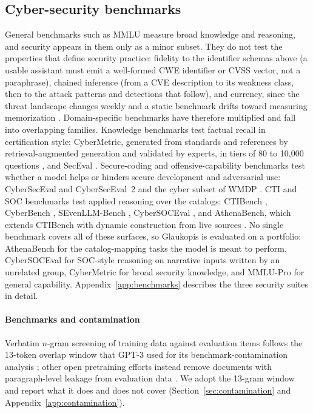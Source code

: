 \documentclass[twocolumn]{svjour3}
\begin{document}
\subsection{Cyber-security benchmarks}\label{sec:bg-benchmarks}
General benchmarks such as MMLU measure broad knowledge and reasoning, and security appears in them only as a minor subset. They do not test the properties that define security practice: fidelity to the identifier schemas above (a usable assistant must emit a well-formed CWE identifier or CVSS vector, not a paraphrase), chained inference (from a CVE description to its weakness class, then to the attack patterns and detections that follow), and currency, since the threat landscape changes weekly and a static benchmark drifts toward measuring memorization \cite{alam2025athenabench}. Domain-specific benchmarks have therefore multiplied and fall into overlapping families. Knowledge benchmarks test factual recall in certification style: CyberMetric, generated from standards and references by retrieval-augmented generation and validated by experts, in tiers of 80 to 10,000 questions \cite{tihanyi2024cybermetric}, and SecEval \cite{li2023seceval}. Secure-coding and offensive-capability benchmarks test whether a model helps or hinders secure development and adversarial use: CyberSecEval and CyberSecEval~2 \cite{bhatt2023cyberseceval,bhatt2024cyberseceval2} and the cyber subset of WMDP \cite{li2024wmdp}. CTI and SOC benchmarks test applied reasoning over the catalogs: CTIBench \cite{alam2024ctibench}, CyberBench \cite{liu2024cyberbench}, SEvenLLM-Bench \cite{ji2024sevenllm}, CyberSOCEval \cite{deason2025cybersoceval}, and AthenaBench, which extends CTIBench with dynamic construction from live sources \cite{alam2025athenabench}. No single benchmark covers all of these surfaces, so Glaukopis is evaluated on a portfolio: AthenaBench for the catalog-mapping tasks the model is meant to perform, CyberSOCEval for SOC-style reasoning on narrative inputs written by an unrelated group, CyberMetric for broad security knowledge, and MMLU-Pro for general capability. Appendix~\ref{app:benchmarks} describes the three security suites in detail.

\paragraph{Benchmarks and contamination}
Verbatim $n$-gram screening of training data against evaluation items follows the 13-token overlap window that GPT-3 used for its benchmark-contamination analysis \cite{brown2020gpt3}; other open pretraining efforts instead remove documents with paragraph-level leakage from evaluation data \cite{groeneveld2024olmo}. We adopt the 13-gram window and report what it does and does not cover (Section~\ref{sec:contamination} and Appendix~\ref{app:contamination}).
\end{document}
